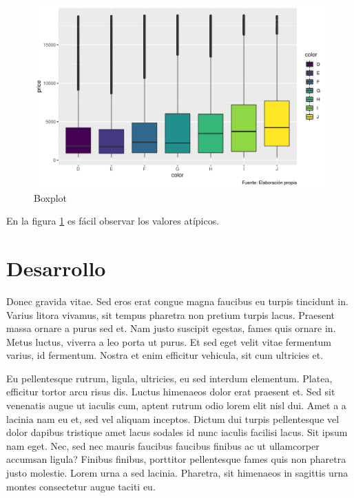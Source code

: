 \documentclass[12pt,spanish,a4paper,]{article}
\begin{document}
\begin{figure}
\centering
\includegraphics{skeleton_files/figure-latex/boxplot-1.pdf}
\caption{\label{fig:boxplot}Boxplot}
\end{figure}

En la figura \ref{fig:boxplot} es fácil observar los valores atípicos.

\hypertarget{desarrollo}{%
\section{Desarrollo}\label{desarrollo}}

Donec gravida vitae. Sed eros erat congue magna faucibus eu turpis tincidunt in. Varius litora vivamus, sit tempus pharetra non pretium turpis lacus. Praesent massa ornare a purus sed et. Nam justo suscipit egestas, fames quis ornare in. Metus luctus, viverra a leo porta ut purus. Et sed eget velit vitae fermentum varius, id fermentum. Nostra et enim efficitur vehicula, sit cum ultricies et.

Eu pellentesque rutrum, ligula, ultricies, eu sed interdum elementum. Platea, efficitur tortor arcu risus dis. Luctus himenaeos dolor erat praesent et. Sed sit venenatis augue ut iaculis cum, aptent rutrum odio lorem elit nisl dui. Amet a a lacinia nam eu et, sed vel aliquam inceptos. Dictum dui turpis pellentesque vel dolor dapibus tristique amet lacus sodales id nunc iaculis facilisi lacus. Sit ipsum nam eget. Nec, sed nec mauris faucibus faucibus finibus ac ut ullamcorper accumsan ligula? Finibus finibus, porttitor pellentesque fames quis non pharetra justo molestie. Lorem urna a sed lacinia. Pharetra, sit himenaeos in sagittis urna montes consectetur augue taciti eu.
\end{document}
